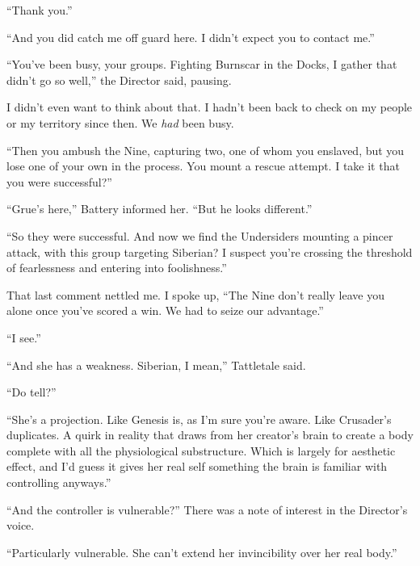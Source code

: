 ``Thank you.''



``And you did catch me off guard here.  I didn't expect you to contact me.''



``You've been busy, your groups.  Fighting Burnscar in the Docks, I gather that didn't go so well,'' the Director said, pausing.



I didn't even want to think about that.  I hadn't been back to check on my people or my territory since then.  We \emph{had} been busy.



``Then you ambush the Nine, capturing two, one of whom you enslaved, but you lose one of your own in the process.  You mount a rescue attempt.  I take it that you were successful?''



``Grue's here,'' Battery informed her.  ``But he looks different.''



``So they were successful.  And now we find the Undersiders mounting a pincer attack, with this group targeting Siberian?  I suspect you're crossing the threshold of fearlessness and entering into foolishness.''



That last comment nettled me.  I spoke up, ``The Nine don't really leave you alone once you've scored a win.  We had to seize our advantage.''



``I see.''



``And she has a weakness.  Siberian, I mean,'' Tattletale said.



``Do tell?''



``She's a projection.  Like Genesis is, as I'm sure you're aware.  Like Crusader's duplicates.  A quirk in reality that draws from her creator's brain to create a body complete with all the physiological substructure.  Which is largely for aesthetic effect, and I'd guess it gives her real self something the brain is familiar with controlling anyways.''



``And the controller is vulnerable?''  There was a note of interest in the Director's voice.



``Particularly vulnerable.  She can't extend her invincibility over her real body.''



